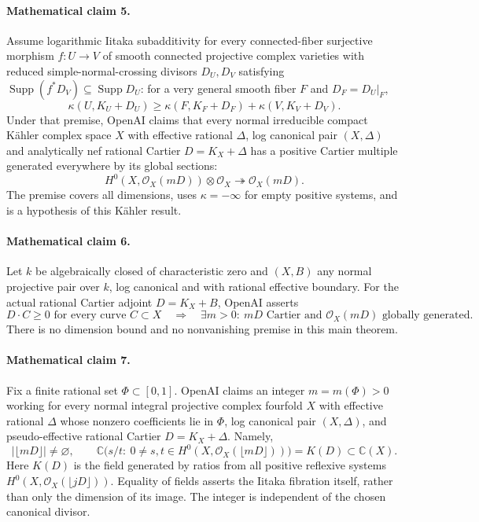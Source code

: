 \documentclass[11pt]{article}
\begin{document}
\paragraph{Mathematical claim 5.} Assume logarithmic Iitaka subadditivity for every connected-fiber surjective morphism $f:U\to V$ of smooth connected projective complex varieties with reduced simple-normal-crossing divisors $D_U,D_V$ satisfying $\operatorname{Supp}(f^*D_V)\subseteq\operatorname{Supp}D_U$: for a very general smooth fiber $F$ and $D_F=D_U|_F$,
\[
\kappa(U,K_U+D_U)\ge\kappa(F,K_F+D_F)+\kappa(V,K_V+D_V).
\]
Under that premise, OpenAI claims that every normal irreducible compact Kähler complex space $X$ with effective rational $\Delta$, log canonical pair $(X,\Delta)$ and analytically nef rational Cartier $D=K_X+\Delta$ has a positive Cartier multiple generated everywhere by its global sections:
\[
H^0(X,\mathcal O_X(mD))\otimes\mathcal O_X\twoheadrightarrow\mathcal O_X(mD).
\]
The premise covers all dimensions, uses $\kappa=-\infty$ for empty positive systems, and is a hypothesis of this Kähler result.

\paragraph{Mathematical claim 6.} Let $k$ be algebraically closed of characteristic zero and $(X,B)$ any normal projective pair over $k$, log canonical and with rational effective boundary. For the actual rational Cartier adjoint $D=K_X+B$, OpenAI asserts
\[
D\cdot C\ge0\text{ for every curve }C\subset X
\quad\Longrightarrow\quad
\exists m>0:\ mD\text{ Cartier and }\mathcal O_X(mD)\text{ globally generated}.
\]
There is no dimension bound and no nonvanishing premise in this main theorem.

\paragraph{Mathematical claim 7.} Fix a finite rational set $\Phi\subset[0,1]$. OpenAI claims an integer $m=m(\Phi)>0$ working for every normal integral projective complex fourfold $X$ with effective rational $\Delta$ whose nonzero coefficients lie in $\Phi$, log canonical pair $(X,\Delta)$, and pseudo-effective rational Cartier $D=K_X+\Delta$. Namely,
\[
|\lfloor mD\rfloor|\ne\varnothing,\qquad
\mathbb C\bigl(s/t:\ 0\ne s,t\in H^0(X,\mathcal O_X(\lfloor mD\rfloor))\bigr)=K(D)\subset\mathbb C(X).
\]
Here $K(D)$ is the field generated by ratios from all positive reflexive systems $H^0(X,\mathcal O_X(\lfloor jD\rfloor))$. Equality of fields asserts the Iitaka fibration itself, rather than only the dimension of its image. The integer is independent of the chosen canonical divisor.
\end{document}
